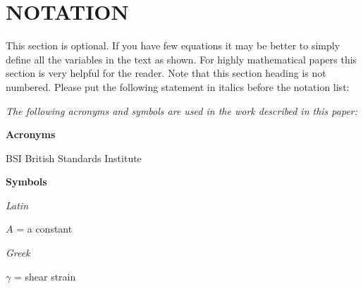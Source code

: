 \section{NOTATION}
This section is optional. If you have few equations it may be better to simply define all the variables in the text as shown. For highly mathematical papers this section is very helpful for the reader. Note that this section heading is not numbered. Please put the following statement in italics before the notation list:

\textit{The following acronyms and symbols are used in the work described in this paper:}

\textbf{Acronyms}

BSI	 British Standards Institute

\textbf{Symbols}

\textit{Latin}

$A$ = a constant

\textit{Greek}

$\gamma$ = shear strain

\fontsize{8}{9}\selectfont